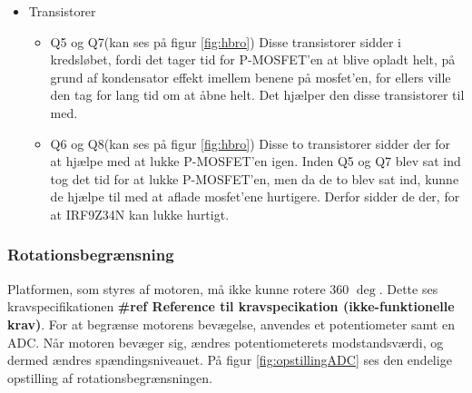 \begin{itemize}
\item Transistorer\\
\begin{itemize}
	\item Q5 og Q7(kan ses på figur \ref{fig:hbro})
	Disse transistorer sidder i kredsløbet, fordi det tager tid for P-MOSFET'en at blive opladt helt, på grund af kondensator effekt imellem benene på mosfet'en, for ellers ville den tag for lang tid om at åbne helt. Det hjælper den disse transistorer til med. 
	
	\item Q6 og Q8(kan ses på figur \ref{fig:hbro})
	Disse to transistorer sidder der for at hjælpe med at lukke P-MOSFET'en igen. Inden Q5 og Q7 blev sat ind tog det tid for at lukke P-MOSFET'en, men da de to blev sat ind, kunne de hjælpe til med at aflade mosfet'ene hurtigere. Derfor sidder de der, for at IRF9Z34N kan lukke hurtigt. 
\end{itemize}
\end{itemize}

\subsubsection{Rotationsbegrænsning}
Platformen, som styres af motoren, må ikke kunne rotere 360 \(\deg\). Dette ses kravspecifikationen \textbf{\#ref Reference til kravspecikation (ikke-funktionelle krav)}. For at begrænse motorens bevægelse, anvendes et potentiometer samt en ADC. Når motoren bevæger sig, ændres potentiometerets modstandsværdi, og dermed ændres spændingsniveauet. På figur \ref{fig:opstillingADC} ses den endelige opstilling af rotationsbegrænsningen.

